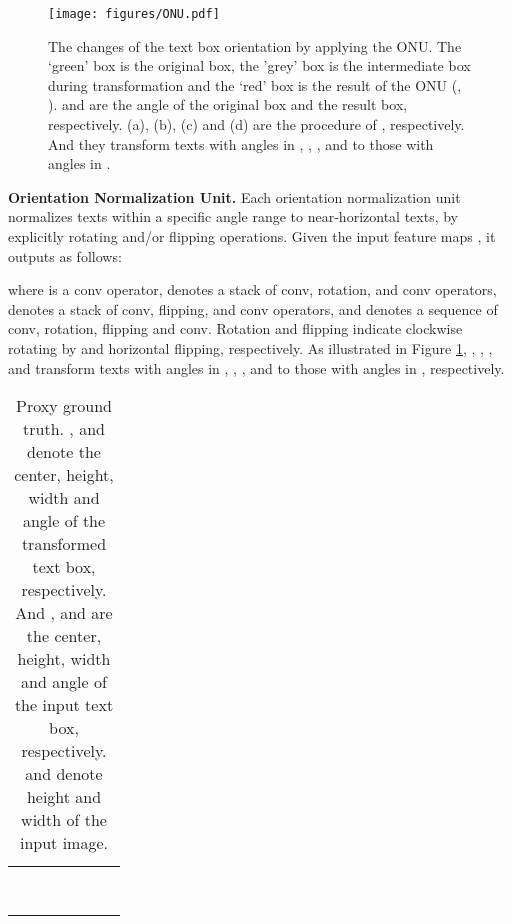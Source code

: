 \documentclass[10pt,twocolumn,letterpaper]{article}
\begin{document}
\begin{figure}
\centering
\texttt{[image: figures/ONU.pdf]}
\caption{The changes of the text box orientation by applying the ONU. The `green' box is the original box, the 'grey' box is the intermediate box during transformation and the `red' box is the result of the ONU (\eg, ).  and  are the angle of the original box and the result box, respectively. (a), (b), (c) and (d) are the procedure of , respectively. And they transform texts with angles in , , , and  to those with angles in .}
\label{fig:ONU}
\end{figure}

\textbf{Orientation Normalization Unit.} Each orientation normalization unit normalizes texts within a specific angle range to near-horizontal texts, by explicitly rotating and/or
flipping operations. Given the input feature maps ,
it outputs  as follows:

where  is a  conv operator,   denotes a stack of  conv, rotation, and  conv operators,
 denotes a stack of  conv, flipping, and  conv operators, and  denotes a sequence of  conv, rotation, flipping and  conv. Rotation and flipping indicate clockwise rotating by   and horizontal flipping, respectively. As illustrated in Figure \ref{fig:ONU}, , , , and  transform texts with angles in , , , and  to those with angles in , respectively.

\begin{table*}[ht]
\centering
\footnotesize
	
	\caption{Proxy ground truth. , and  denote the center, height, width and angle of the transformed text box, respectively. And , and  are the center, height, width and angle of the input text box, respectively.  and  denote height and width of the input image.}
	\label{tab:tab_pgt}
    \begin{tabular}{c|c|c|c|c|c|c}
    \hline
	&&&&&& \\ \hline
    &                &     & & && \\ \hline &          &  & & &&  \\ \hline &          &      & & && \\ \hline &       &   & & && \\ \hline 

    &&   & & &&\\ \hline && & & && \\ \hline && & & && \\ \hline && & & && \\ \hline \end{tabular}
\end{table*}
\end{document}
